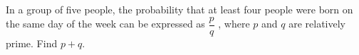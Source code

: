 In a group of five people, the probability that at least four people were born on the same day of the week can be expressed as $\dfrac{p}{q}$ , where $p$ and $q$ are relatively prime. Find $p + q$.
